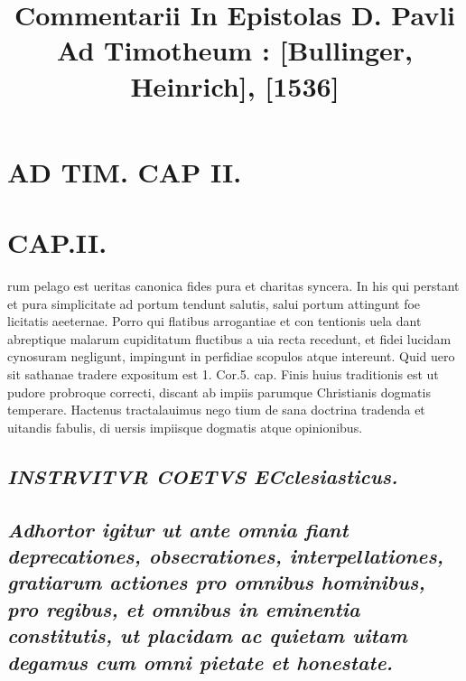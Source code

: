 \documentclass{article}
\begin{document}
\date{}
        \title{Commentarii In Epistolas D. Pavli Ad Timotheum : [Bullinger, Heinrich], [1536]}
\maketitle
\tableofcontents
\clearpage
\begin{pages} 
\beginnumbering
        
\section*{AD TIM. CAP II. }
\marginpar{[ p.107 ]}
\endnumbering\beginnumbering\section{CAP.II.}\pstart rum pelago est ueritas canonica fides pura et charitas syncera. In his qui perstant et pura simplicitate ad portum tendunt salutis, salui portum attingunt foe licitatis aeeternae. Porro qui flatibus arrogantiae et con tentionis uela dant abreptique malarum cupiditatum fluctibus a uia recta recedunt, et fidei lucidam cynosuram negligunt, impingunt in perfidiae scopulos atque intereunt. Quid uero sit sathanae tradere expositum est 1. Cor.5. cap. Finis huius traditionis est ut pudore probroque correcti, discant ab impiis parumque Christianis dogmatis temperare. Hactenus tractalauimus nego tium de sana doctrina tradenda et uitandis fabulis, di uersis impiisque dogmatis atque opinionibus.  \pend
{}
{}
\subsection*{\textit{INSTRVITVR COETVS ECclesiasticus. }}
{}
\subsection*{\textit{Adhortor igitur ut ante omnia fiant deprecationes, obsecrationes, interpellationes, gratiarum actiones pro omnibus hominibus, pro regibus, et omnibus in eminentia constitutis, ut placidam ac quietam uitam degamus cum omni pietate et honestate. }}

\end{pages}
\end{document}
